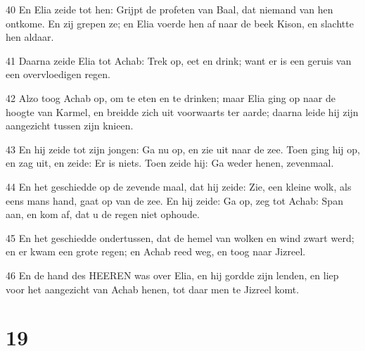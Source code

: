 \par 40 En Elia zeide tot hen: Grijpt de profeten van Baal, dat niemand van hen ontkome. En zij grepen ze; en Elia voerde hen af naar de beek Kison, en slachtte hen aldaar.
\par 41 Daarna zeide Elia tot Achab: Trek op, eet en drink; want er is een geruis van een overvloedigen regen.
\par 42 Alzo toog Achab op, om te eten en te drinken; maar Elia ging op naar de hoogte van Karmel, en breidde zich uit voorwaarts ter aarde; daarna leide hij zijn aangezicht tussen zijn knieen.
\par 43 En hij zeide tot zijn jongen: Ga nu op, en zie uit naar de zee. Toen ging hij op, en zag uit, en zeide: Er is niets. Toen zeide hij: Ga weder henen, zevenmaal.
\par 44 En het geschiedde op de zevende maal, dat hij zeide: Zie, een kleine wolk, als eens mans hand, gaat op van de zee. En hij zeide: Ga op, zeg tot Achab: Span aan, en kom af, dat u de regen niet ophoude.
\par 45 En het geschiedde ondertussen, dat de hemel van wolken en wind zwart werd; en er kwam een grote regen; en Achab reed weg, en toog naar Jizreel.
\par 46 En de hand des HEEREN was over Elia, en hij gordde zijn lenden, en liep voor het aangezicht van Achab henen, tot daar men te Jizreel komt.

\chapter{19}

